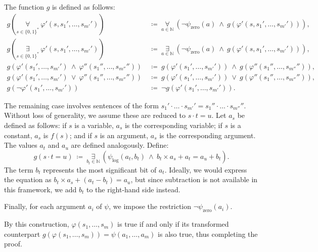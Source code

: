 \documentclass[12pt]{article}
\begin{document}
	\medskip
	
	The function \(g\) is defined as follows:
	\begin{align*}
		g \left( \underset{s \in \{0, 1\}^{\ast}}{\forall} \ \varphi'(s, s_{1}',
		\ldots, s_{m'}') \right) \ &\coloneqq \ \underset{a \in \mathbb{N}}
		{\forall} \ (\neg \psi_{\text{zero}}(a) \ \wedge \ g(\varphi'(s, s_{1}',
		\ldots, s_{m'}'))) \text{,} \\[0.2 cm]
		g \left( \underset{s \in \{0, 1\}^{\ast}}{\exists} \ \varphi'(s, s_{1}',
		\ldots, s_{m'}') \right) \ &\coloneqq \ \underset{a \in \mathbb{N}}
		{\exists} \ (\neg \psi_{\text{zero}}(a) \ \wedge \ g(\varphi'(s, s_{1}',
		\ldots, s_{m'}'))) \text{,} \\[0.2 cm]
		g(\varphi'(s_{1}', \ldots, s_{m'}') \ \wedge \ \varphi''(s_{1}'',
		\ldots, s_{m''}'')) \ &\coloneqq \ g(\varphi'(s_{1}', \ldots, s_{m'}'))
		\ \wedge \ g(\varphi''(s_{1}'', \ldots, s_{m''}'')) \text{,} \\[0.2 cm]
		g(\varphi'(s_{1}', \ldots, s_{m'}') \ \vee \ \varphi''(s_{1}'', \ldots,
		s_{m''}'')) \ &\coloneqq \ g(\varphi'(s_{1}', \ldots, s_{m'}')) \ \vee \
		g(\varphi''(s_{1}'', \ldots, s_{m''}'')) \text{,} \\[0.2 cm]
		g(\neg \varphi'(s_{1}', \ldots, s_{m'}')) \ &\coloneqq \ \neg
		g(\varphi'(s_{1}', \ldots, s_{m'}')) \text{.}
	\end{align*}
	
	The remaining case involves sentences of the form \(s_{1}' \cdot \ldots
	\cdot s_{m'}' = s_{1}'' \cdot \ldots \cdot s_{m''}''\). Without loss of
	generality, we assume these are reduced to \(s \cdot t = u\). Let \(a_{s}\)
	be defined as follows: if \(s\) is a variable, \(a_{s}\) is the
	corresponding variable; if \(s\) is a constant, \(a_{s}\) is \(f(s)\); and
	if \(s\) is an argument, \(a_{s}\) is the corresponding argument. The values
	\(a_{t}\) and \(a_{u}\) are defined analogously. Define:
	\[ g(s \cdot t = u) \ \coloneqq \ \underset{b_{t} \in \mathbb{N}}{\exists} \
	\left( \psi_{\text{log}}(a_{t}, b_{t}) \ \wedge \ b_{t} \times a_{s} + a_{t}
	= a_{u} + b_{t} \right) \text{.} \]
	The term \(b_{t}\) represents the most significant bit of \(a_{t}\).
	Ideally, we would express the equation as \(b_{t} \times a_{s} + (a_{t} -
	b_{t}) = a_{u}\), but since subtraction is not available in this framework,
	we add \(b_{t}\) to the right-hand side instead.
	
	\medskip
	
	Finally, for each argument \(a_{i}\) of \(\psi\), we impose the restriction
	\(\neg \psi_{\text{zero}}(a_{i})\).
	
	\medskip
	
	By this construction, \(\varphi(s_{1}, \ldots, s_{m})\) is true if and only
	if its transformed counterpart \(g(\varphi(s_{1}, \ldots, \allowbreak
	s_{m})) = \psi(a_{1}, \ldots, a_{m})\) is also true, thus completing the
	proof.
\end{document}
